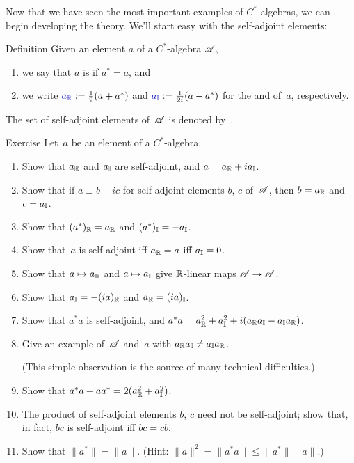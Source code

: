 \documentclass[a]{subfiles}
\begin{document}
\begin{parsec}%
\begin{point}%
Now that we have seen the most important examples
of $C^*$-algebras,
we can begin developing the theory.
We'll start easy with the self-adjoint elements:
\end{point}
\begin{point}{Definition}%
Given an element $a$ of a $C^*$-algebra $\mathscr{A}$, 
\begin{enumerate}
\item we say that $a$ is  if $a^* =a$, and
\item we write $\Define{\Real{a}}:= \frac{1}{2}(a+a^*)$
and $\Define{\Imag{a}}:=\frac{1}{2i}(a-a^*)$
for the  and 
of~$a$, respectively.
\end{enumerate}
The set of self-adjoint elements of~$\mathscr{A}$
is denoted by~\Define{$\sa{\scrA}$}.
\end{point}
\begin{point}{Exercise}%
Let~$a$ be an element of a $C^*$-algebra.
\begin{enumerate}
\item 
Show that $a_{\mathbb{R}}$ and $a_{\mathbb{I}}$ are self-adjoint,
and  $a= a_{\mathbb{R}}+ia_{\mathbb{I}}$.
\item
Show that if $a\equiv b+ic$ for self-adjoint elements $b$, $c$ of~$\mathscr{A}$,
then $b=a_{\mathbb{R}}$ and~$c=a_{\mathbb{I}}$.
\item
Show that $(a^*)_{\mathbb{R}}=a_{\mathbb{R}}$ and $(a^*)_{\mathbb{I}}=-a_{\mathbb{I}}$.
\item 
Show that~$a$ is self-adjoint iff $a_{\mathbb{R}}=a$ iff $a_{\mathbb{I}}=0$.
\item
Show that $a\mapsto a_{\mathbb{R}}$ and $a\mapsto a_{\mathbb{I}}$
give $\mathbb{R}$-linear maps $\mathscr{A}\to\mathscr{A}$.
\item
Show that $a_{\mathbb{I}} = -(ia)_{\mathbb{R}}$ and $a_{\mathbb{R}}=(ia)_{\mathbb{I}}$.
\item
Show that $a^*a$ is self-adjoint,
and  $a^*a=a_{\mathbb{R}}^2+a_{\mathbb{I}}^2+i(a_{\mathbb{R}}a_{\mathbb{I}}-a_{\mathbb{I}}a_{\mathbb{R}})$.
\item
Give an example of~$\mathscr{A}$ and~$a$ 
with  $a_{\mathbb{R}}a_{\mathbb{I}} \neq a_{\mathbb{I}}a_{\mathbb{R}}$.

(This simple observation is the source of many technical difficulties.)
\item
Show that $a^*a+aa^* = 2(a_{\mathbb{R}}^2+a_{\mathbb{I}}^2)$.
\item
The product of self-adjoint elements $b$, $c$ need not be self-adjoint;
show that, in fact, $bc$ is self-adjoint iff $bc=cb$.
\item
Show that $\|a^*\| = \|a\|$. (Hint:  $\|a\|^2=\|a^*a\|\leq \|a^*\|\|a\|$.)


\end{enumerate}
\end{point}
\end{parsec}
\end{document}

